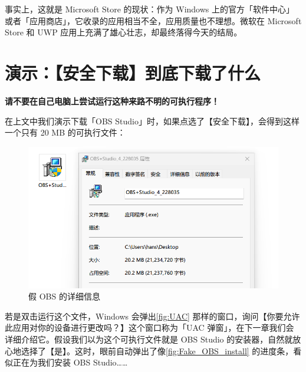 {{事实上，这就是 Microsoft Store 的现状：作为 Windows 上的官方「软件中心」或者「应用商店」，它收录的应用相当不全，应用质量也不理想。微软在 Microsoft Store 和 UWP 应用上充满了雄心壮志，却最终落得今天的结局。

\section{演示：【安全下载】到底下载了什么}

\begin{dangerbox}
  \textbf{请不要在自己电脑上尝试运行这种来路不明的可执行程序！}
\end{dangerbox}

在上文中我们演示下载「OBS Studio」时，如果点选了【安全下载】，会得到这样一个只有 20 MB 的可执行文件：

\begin{figure}[htb!]
  \centering
  \includegraphics[width=.65\textwidth]{assets/basic/Fake_OBS_installer.png}
  \caption{假 OBS 的详细信息}
  \label{fig:Fake_OBS_installer}
\end{figure}

若是双击运行这个文件，Windows 会弹出\autoref{fig:UAC} 那样的窗口，询问【你要允许此应用对你的设备进行更改吗？】这个窗口称为「UAC 弹窗」，在下一章我们会详细介绍它。假设我们以为这个可执行文件就是 OBS Studio 的安装器，自然就放心地选择了【是】。这时，眼前自动弹出了像\autoref{fig:Fake_OBS_install} 的进度条，看似正在为我们安装 OBS Studio……

}}
